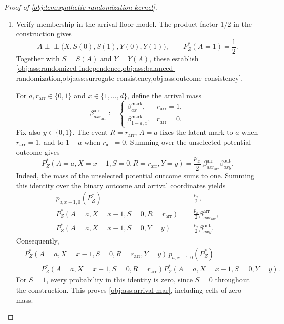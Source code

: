 \documentclass[11pt]{article}
\begin{document}
\begin{proof}[Proof of \cref{obj:lem:synthetic-randomization-kernel}]
\begin{enumerate}
On this probability space set
\[
S(0):=S(1):=0,\qquad
S:=S(A),\qquad
Y:=Y(A),\qquad
R:=\mathbf 1\{B^{\mathrm{lat}}=A\},
\]
and define the full-data law
\[
P_Z^*
:=
\mathcal L_{\mathbb P_{\mathrm{lat}}}
\bigl(X,A,S(0),S(1),Y(0),Y(1),S,Y,R\bigr).
\]
Here \(\mathcal L\) denotes the distribution of the displayed coordinates.

\item Verify membership in the arrival-floor model. The product factor \(1/2\) in the construction gives
\[
A\perp\!\!\!\perp
\bigl(X,S(0),S(1),Y(0),Y(1)\bigr),
\qquad
P_Z^*(A=1)=\frac12.
\]
Together with \(S=S(A)\) and \(Y=Y(A)\), these establish
\cref{obj:ass:randomized-independence,obj:ass:balanced-randomization,obj:ass:surrogate-consistency,obj:ass:outcome-consistency}.

For \(a,r_{\mathrm{arr}}\in\{0,1\}\) and \(x\in\{1,\ldots,d\}\), define the arrival mass
\[
\beta^{\mathrm{arr}}_{axr_{\mathrm{arr}}}
:=
\begin{cases}
\beta^{\mathrm{mark}}_{ax},&r_{\mathrm{arr}}=1,\\
\beta^{\mathrm{mark}}_{1-a,x},&r_{\mathrm{arr}}=0.
\end{cases}
\]
Fix also \(y\in\{0,1\}\). The event \(R=r_{\mathrm{arr}}\), \(A=a\) fixes the latent mark to \(a\) when \(r_{\mathrm{arr}}=1\), and to \(1-a\) when \(r_{\mathrm{arr}}=0\). Summing over the unselected potential outcome gives
\begin{equation}\label{eq:synthetic-randomization-joint-mass}
P_Z^*(A=a,X=x-1,S=0,R=r_{\mathrm{arr}},Y=y)
=
\frac{p_x}{2}\,
\beta^{\mathrm{arr}}_{axr_{\mathrm{arr}}}
\beta^{\mathrm{out}}_{axy}.
\end{equation}
Indeed, the mass of the unselected potential outcome sums to one. Summing this identity over the binary outcome and arrival coordinates yields
\[
\begin{aligned}
p_{a,x-1,0}(P_Z^*)&=\frac{p_x}{2},\\
P_Z^*(A=a,X=x-1,S=0,R=r_{\mathrm{arr}})
&=\frac{p_x}{2}\beta^{\mathrm{arr}}_{axr_{\mathrm{arr}}},\\
P_Z^*(A=a,X=x-1,S=0,Y=y)
&=\frac{p_x}{2}\beta^{\mathrm{out}}_{axy}.
\end{aligned}
\]
Consequently,
\[
\begin{aligned}
&P_Z^*(A=a,X=x-1,S=0,R=r_{\mathrm{arr}},Y=y)\,
p_{a,x-1,0}(P_Z^*)\\
&\quad=
P_Z^*(A=a,X=x-1,S=0,R=r_{\mathrm{arr}})
P_Z^*(A=a,X=x-1,S=0,Y=y).
\end{aligned}
\]
For \(S=1\), every probability in this identity is zero, since \(S=0\) throughout the construction. This proves \cref{obj:ass:arrival-mar}, including cells of zero mass.


\end{enumerate}
\end{proof}
\end{document}
